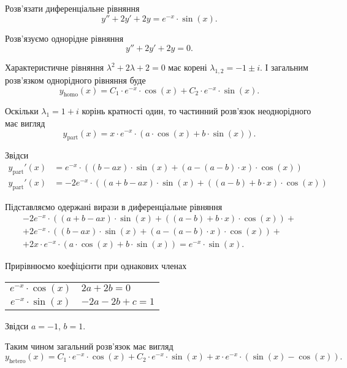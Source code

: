 \begin{example}
	Розв'язати диференціальне рівняння \[y'' + 2 y' + 2 y = e^{-x} \cdot \sin (x).\]
\end{example}
\begin{solution}
	Розв'язуємо однорідне рівняння
	\begin{equation*}
		y'' + 2 y' + 2y = 0.
	\end{equation*}

	Характеристичне рівняння $\lambda^2 + 2 \lambda + 2 = 0$ має корені $\lambda_{1,2} = -1\pm i$. І загальним розв'язком однорідного рівняння буде
	\begin{equation*}
		y_{\text{homo}}(x) = C_1 \cdot e^{-x} \cdot \cos(x) + C_2 \cdot e^{-x} \cdot \sin(x).
	\end{equation*}

	Оскільки $\lambda_1 = 1 + i$ корінь кратності один, то частинний роз\-в'яз\-ок неоднорідного має вигляд
	\begin{equation*}
		y_{\text{part}}(x) = x \cdot e^{-x} \cdot (a \cdot \cos(x) + b \cdot \sin(x)).
	\end{equation*}

	Звідси
	\begin{align*}
		y_{\text{part}}'(x) &= e^{-x} \cdot ((b - a x) \cdot \sin(x) + (a - (a - b) \cdot x) \cdot \cos(x)) \\
		y_{\text{part}}'(x) &= -2 e^{-x} \cdot ((a + b - a x) \cdot \sin(x) + ((a - b) + b \cdot x) \cdot \cos(x))
	\end{align*}

	Підставляємо одержані вирази в диференціальне рівняння
	\begin{multline*}
		-2 e^{-x} \cdot ((a + b - a x) \cdot \sin(x) + ((a - b) + b \cdot x) \cdot \cos(x)) + \\ + 2 e^{-x} \cdot ((b - a x) \cdot \sin(x) + (a - (a - b) \cdot x) \cdot \cos(x)) + \\ + 2 x \cdot e^{-x} \cdot (a \cdot \cos(x) + b \cdot \sin(x)) = e^{-x} \cdot \sin(x). 
	\end{multline*}

	Прирівнюємо коефіцієнти при однакових членах
	\begin{table}[H]
		\centering
		\begin{tabular}{c|l}
			$e^{-x} \cdot \cos(x)$ & $2a + 2b = 0$ \\
			$e^{-x} \cdot \sin(x)$ & $-2 a - 2 b + c = 1$
		\end{tabular}
	\end{table}

	Звідси $a = -1$, $b = 1$. \parvskip

	Таким чином загальний розв'язок має вигляд
	\begin{equation*}
		y_{\text{hetero}}(x) = C_1 \cdot e^{-x} \cdot \cos(x) + C_2 \cdot e^{-x} \cdot \sin(x) + x \cdot e^{-x} \cdot \left( \sin(x) - \cos(x) \right).
	\end{equation*}
\end{solution}

